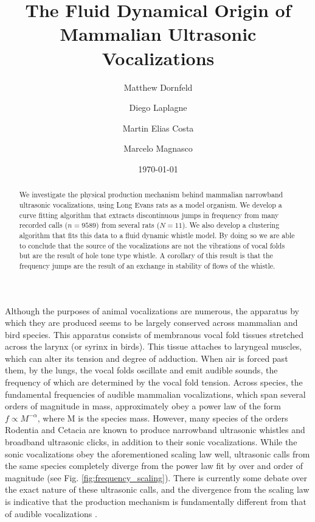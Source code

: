 \documentclass[superscriptaddress, twocolumn, prl]{revtex4}
\begin{document}
\title{The Fluid Dynamical Origin of Mammalian Ultrasonic Vocalizations}

\author{Matthew Dornfeld}

\author{Diego Laplagne}

\author{Martin Elias Costa} 

\author{Marcelo Magnasco}
\date{\today}
\begin{abstract}
We investigate the physical production mechanism behind mammalian narrowband ultrasonic vocalizations, using Long Evans rats as a model organism. We develop a curve fitting algorithm that extracts discontinuous jumps in frequency from many recorded calls ($n=9589$) from several rats ($N=11$). We also develop a clustering algorithm that fits this data to a fluid dynamic whistle model. By doing so we are able to conclude that the source of the vocalizations are not the vibrations of vocal folds but are the result of hole tone type whistle. A corollary of this result is that the frequency jumps are the result of an exchange in stability of flows of the whistle.
\end{abstract}
\maketitle
Although the purposes of animal vocalizations are numerous, the apparatus by which they are produced seems to be largely conserved across mammalian and bird species. This apparatus consists of membranous vocal fold tissues stretched across the larynx (or syrinx in birds). This tissue attaches to laryngeal muscles, which can alter its tension and degree of adduction. When air is forced past them, by the lungs, the vocal folds oscillate and emit audible sounds, the frequency of which are determined by the vocal fold tension. Across species, the fundamental frequencies of audible mammalian vocalizations, which span several orders of magnitude in mass, approximately obey a power law of the form $f\propto M^{-\alpha}$, where M is the species mass. However, many species of the orders Rodentia and Cetacia are known to produce narrowband ultrasonic whistles and broadband ultrasonic clicks, in addition to their sonic vocalizations. While the sonic vocalizations obey the aforementioned scaling law well, ultrasonic calls from the same species completely diverge from the power law fit by over and order of magnitude (see Fig. \ref{fig:frequency_scaling}). There is currently some debate over the exact nature of these ultrasonic calls, and the divergence from the scaling law is indicative that the production mechanism is fundamentally different from that of audible vocalizations \cite{Fletcher2010, Berke2010}.
\end{document}
